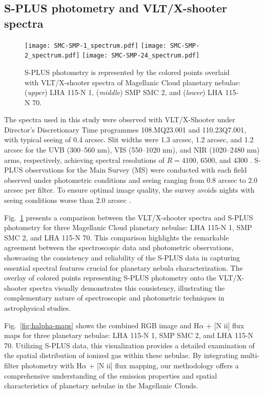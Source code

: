 \documentclass[baaa]{baaa}
\begin{document}
\subsection{S-PLUS photometry and VLT/X-shooter spectra}\label{sec:splus-vlt}

\begin{figure}[h]
\centering
\texttt{[image: SMC-SMP-1\_spectrum.pdf]}
\texttt{[image: SMC-SMP-2\_spectrum.pdf]}
\texttt{[image: SMC-SMP-24\_spectrum.pdf]}
\caption{S-PLUS photometry is represented by the colored points overlaid with VLT/X-shooter spectra of Magellanic Cloud planetary nebulae: (\textit{upper}) LHA 115-N 1, (\textit{middle}) SMP SMC 2, and (\textit{lower}) LHA 115-N 70.}
\label{fig:spectra}
\end{figure}

The spectra used in this study were observed with VLT/X-Shooter under Director’s Discretionary Time programmes 108.MQ23.001 and 110.23Q7.001, with typical seeing of 0.4 arcsec. Slit widths were 1.3 arcsec, 1.2 arcsec, and 1.2 arcsec for the UVB (300–560 nm), VIS (550–1020 nm), and NIR (1020–2480 nm) arms, respectively, achieving spectral resolutions of $R = 4100$, $6500$, and $4300$ \citep{Paterson:2023}. S-PLUS observations for the Main Survey (MS) were conducted with each field observed under photometric conditions and seeing ranging from 0.8 arcsec to 2.0 arcsec per filter. To ensure optimal image quality, the survey avoids nights with seeing conditions worse than 2.0 arcsec \citep{Mendes:2019, Almeida:2022}.

Fig.~\ref{fig:spectra} presents a comparison between the VLT/X-shooter spectra and S-PLUS photometry for three Magellanic Cloud planetary nebulae: LHA 115-N 1, SMP SMC 2, and LHA 115-N 70. This comparison highlights the remarkable agreement between the spectroscopic data and photometric observations, showcasing the consistency and reliability of the S-PLUS data in capturing essential spectral features crucial for planetary nebula characterization. The overlay of colored points representing S-PLUS photometry onto the VLT/X-shooter spectra visually demonstrates this consistency, illustrating the complementary nature of spectroscopic and photometric techniques in astrophysical studies.
 
 
Fig.~\ref{fig:halpha-maps} shows the combined RGB image and  H$\alpha$ + [N {\sc ii}] flux maps for three planetary nebulae: LHA 115-N 1, SMP SMC 2, and LHA 115-N 70. Utilizing S-PLUS data, this visualization provides a detailed examination of the spatial distribution of ionized gas within these nebulae. By integrating multi-filter photometry with  H$\alpha$ + [N {\sc ii}] flux mapping, our methodology offers a comprehensive understanding of the emission properties and spatial characteristics of planetary nebulae in the Magellanic Clouds.
\end{document}
